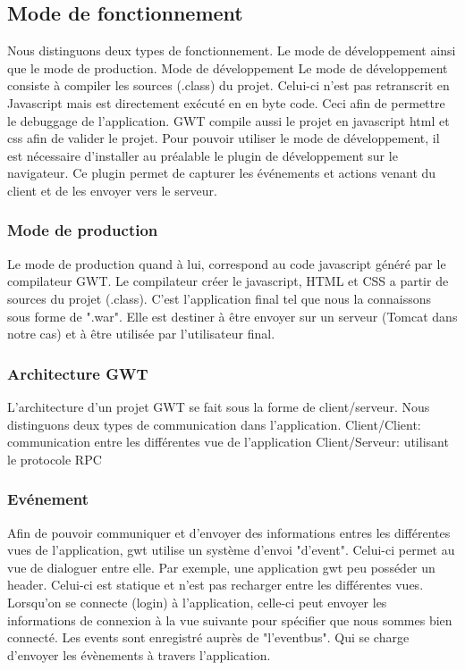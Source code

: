 \subsection{Mode de fonctionnement}
Nous distinguons deux types de fonctionnement. Le mode de développement ainsi que le mode de production.
Mode de développement
Le mode de développement consiste à compiler les sources (.class) du projet. Celui-ci n'est pas retranscrit en Javascript mais est directement exécuté en en byte code. Ceci afin de permettre le debuggage de l'application. GWT compile aussi le projet en javascript html et css afin de valider le projet.
Pour pouvoir utiliser le mode de développement, il est nécessaire d'installer au préalable le plugin de développement sur le navigateur. Ce plugin permet de capturer les événements et actions venant du client et de les envoyer vers le serveur.

\subsubsection{Mode de production}
Le mode de production quand à lui, correspond au code javascript généré par le compilateur GWT. Le compilateur créer le javascript, HTML et CSS a partir de sources du projet (.class). C'est l'application final tel que nous la connaissons sous forme de ".war". Elle est destiner à être envoyer sur un serveur (Tomcat dans notre cas) et à être utilisée par l'utilisateur final.

\subsubsection{Architecture GWT}
L'architecture d'un projet GWT se fait sous la forme de client/serveur. Nous distinguons deux types de communication dans l'application.
Client/Client: communication entre les différentes vue de l'application
Client/Serveur: utilisant le protocole RPC 

\subsubsection{Evénement}
Afin de pouvoir communiquer et d'envoyer des informations entres les différentes vues de l'application, gwt utilise un système d'envoi "d'event". Celui-ci permet au vue de dialoguer entre elle.
Par exemple, une application gwt peu posséder un header. Celui-ci est statique et n'est pas recharger entre les différentes vues. Lorsqu'on se connecte (login) à l'application, celle-ci peut envoyer les informations de connexion à la vue suivante pour spécifier que nous sommes bien connecté.
Les events sont enregistré auprès de "l'eventbus". Qui se charge d'envoyer les évènements à travers l'application.

